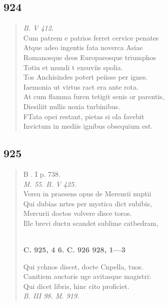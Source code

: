 \documentclass[11pt, a4paper]{report}
\begin{document}
            \subsection*{924}
      \begin{verse}
      \textit{B. V 412.} \\ Cum patrem e patrios ferret cervice penates \\ Atque adeo ingentis fata noverca Asiae \\ Romanosque deos Europaeosque triumphos \\ Totiu et mundi t exsuviis spolia. \\ Tos Anchisindes potert peiisse per ignes. \\ Iaemonia ut virtus ract era ante rota. \\ At cum flamma furen tetigit senis or parentis, \\ Diesiliit nullis noxia turbinibus. \\ FTata opei restant, pietas si ola favebit \\ Invictum in mediis ignibus obsequium est. \\ 
      \end{verse}
  
            \subsection*{925}
      \begin{verse}
      B . I p. 738. \\ \textit{M. 55. B. V 425.} \\ Versu in praesens opus de Mereurii nuptii \\ Qui dubias nrtes per mystica dict subibis, \\ Mercurii doctos volvere disce toros. \\ Ille brevi ductu scandet sublime catbedram, \\ 
        ﻿\pagebreak 
    \begin{center} \textbf{C. 925, 4 6. C. 926 928, 1—3} \end{center} \marginpar{[349]} Qui ychnos discet, docte Cnpella, tuos. \\ Canitiem auctoris uge avitasque magistri: \\ Qui dicet libris, hinc cito proficiet. \\ \textit{B. III 98. M. 919.} \\ 
      \end{verse}
  
\end{document}
